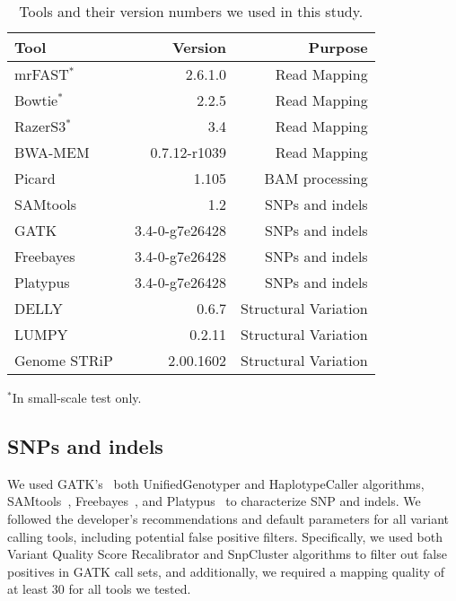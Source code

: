 \documentclass[10pt,a4paper]{article}
\begin{document}
\begin{table}[htb]
\caption{Tools and their version numbers we used in this study.}
\begin{center}
\begin{tabular}{|l|r|r|}
\hline
{\bf Tool} & {\bf Version} & {\bf Purpose}\\
\hline
mrFAST$^*$~\cite{Alkan2009,Xin2013} & 2.6.1.0 & Read Mapping \\
Bowtie$^*$~\cite{Langmead2009} & 2.2.5 & Read Mapping \\
RazerS3$^*$~\cite{Weese2012} & 3.4 & Read Mapping\\
BWA-MEM~\cite{Li2013} & 0.7.12-r1039 & Read Mapping\\
Picard~\cite{picard} & 1.105 & BAM processing\\
SAMtools~~\cite{Li2009b} & 1.2 & SNPs and indels\\
GATK~\cite{DePristo2011} & 3.4-0-g7e26428 & SNPs and indels\\
Freebayes~\cite{Garrison2012} & 3.4-0-g7e26428 & SNPs and indels\\
Platypus~\cite{Rimmer2014} & 3.4-0-g7e26428 & SNPs and indels\\
DELLY~\cite{Rausch2012} & 0.6.7 & Structural Variation\\
LUMPY~\cite{Layer2014} & 0.2.11 & Structural Variation\\
Genome STRiP~\cite{Handsaker2011,Handsaker2015} & 2.00.1602 & Structural Variation\\
\hline
\end{tabular}
\end{center}
    {\footnotesize $^*$In small-scale test only.}

\label{tab:tools}
\end{table}

\subsection{SNPs and indels}

We used GATK's~\cite{DePristo2011} both UnifiedGenotyper and HaplotypeCaller algorithms, SAMtools~\cite{Li2009b}, Freebayes~\cite{Garrison2012}, and Platypus~\cite{Rimmer2014} to characterize
SNP and indels. We followed the developer's recommendations and default parameters for all variant calling tools, including potential false positive filters. 
Specifically, we used both Variant Quality Score Recalibrator and SnpCluster algorithms to filter out false positives in GATK call sets, and additionally, 
we required a mapping quality of at least 30 for all tools we tested.
\end{document}
